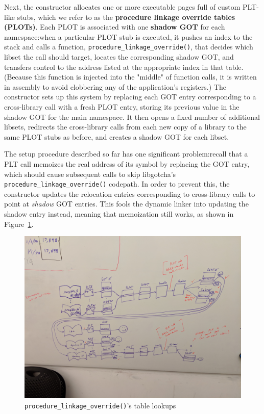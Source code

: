 Next, the constructor allocates one or more executable pages full of custom PLT-like
stubs, which we refer to as the \textbf{procedure linkage override tables (PLOTs)}.
Each PLOT is associated with one \textbf{shadow GOT} for each namespace:\@ when a
particular PLOT stub is executed, it pushes an index to the stack and calls a
function, \texttt{procedure\_linkage\_override()}, that decides which libset the call
should target, locates the corresponding shadow GOT, and transfers control to the
address listed at the appropriate index in that table.  (Because this function
is injected into the "middle" of function calls, it is written in assembly to avoid
clobbering any of the application's registers.)  The constructor sets up this system
by replacing each GOT entry corresponding to a cross-library call with a fresh PLOT
entry, storing its previous value in the shadow GOT for the main namespace.  It then
opens a fixed number of additional libsets, redirects the cross-library calls from
each new copy of a library to the same PLOT stubs as before, and creates a shadow GOT
for each libset.

The setup procedure described so far has one significant problem:\@ recall that a PLT
call memoizes the real address of its symbol by replacing the GOT entry, which should
cause subsequent calls to skip libgotcha's \texttt{procedure\_linkage\_override()}
codepath.  In order to prevent this, the constructor updates the relocation entries
corresponding to cross-library calls to point at \textit{shadow} GOT entries.  This
fools the dynamic linker into updating the shadow entry instead, meaning that
memoization still works, as shown in Figure~\ref{fig:override}.

\begin{figure}
\includegraphics[width=\columnwidth]{figs/tables}
\caption{\texttt{procedure\_linkage\_override()}'s table lookups}
\label{fig:override}
\end{figure}

